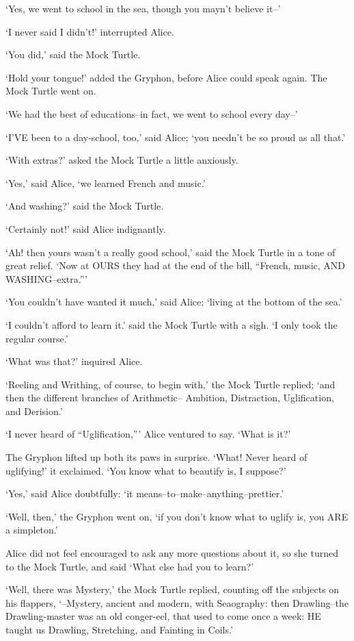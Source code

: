 \documentclass[12pt]{book}
\begin{document}
  `Yes, we went to school in the sea, though you mayn't believe
it--'

  `I never said I didn't!' interrupted Alice.

  `You did,' said the Mock Turtle.

  `Hold your tongue!' added the Gryphon, before Alice could speak
again.  The Mock Turtle went on.

  `We had the best of educations--in fact, we went to school
every day--'

  `I'VE been to a day-school, too,' said Alice; `you needn't be
so proud as all that.'

  `With extras?' asked the Mock Turtle a little anxiously.

  `Yes,' said Alice, `we learned French and music.'

  `And washing?' said the Mock Turtle.

  `Certainly not!' said Alice indignantly.

  `Ah! then yours wasn't a really good school,' said the Mock
Turtle in a tone of great relief.  `Now at OURS they had at the
end of the bill, ``French, music, AND WASHING--extra.'''

  `You couldn't have wanted it much,' said Alice; `living at the
bottom of the sea.'

  `I couldn't afford to learn it.' said the Mock Turtle with a
sigh.  `I only took the regular course.'

  `What was that?' inquired Alice.

  `Reeling and Writhing, of course, to begin with,' the Mock
Turtle replied; `and then the different branches of Arithmetic--
Ambition, Distraction, Uglification, and Derision.'

  `I never heard of ``Uglification,''' Alice ventured to say.  `What is it?'

  The Gryphon lifted up both its paws in surprise.  `What!  Never
heard of uglifying!' it exclaimed.  `You know what to beautify is,
I suppose?'

  `Yes,' said Alice doubtfully:  `it means--to--make--anything--prettier.'

  `Well, then,' the Gryphon went on, `if you don't know what to
uglify is, you ARE a simpleton.'

  Alice did not feel encouraged to ask any more questions about
it, so she turned to the Mock Turtle, and said `What else had you
to learn?'

  `Well, there was Mystery,' the Mock Turtle replied, counting
off the subjects on his flappers, `--Mystery, ancient and modern,
with Seaography:  then Drawling--the Drawling-master was an old
conger-eel, that used to come once a week:  HE taught us
Drawling, Stretching, and Fainting in Coils.'
\end{document}
